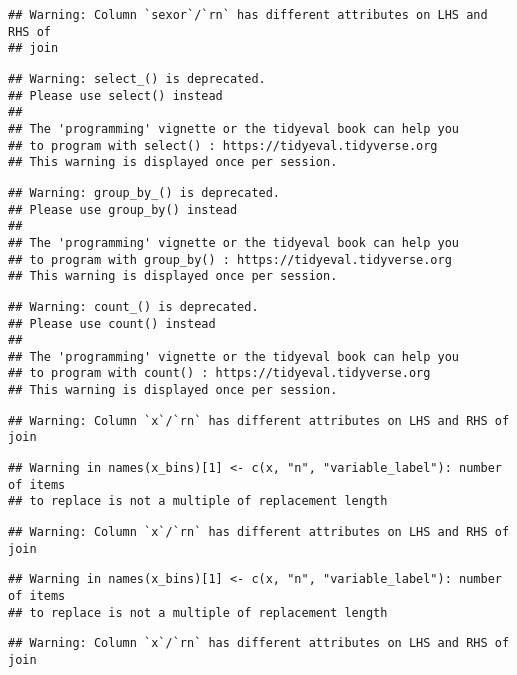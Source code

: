 \documentclass[man]{apa6}
\begin{document}
\begin{verbatim}
## Warning: Column `sexor`/`rn` has different attributes on LHS and RHS of
## join
\end{verbatim}

\begin{verbatim}
## Warning: select_() is deprecated. 
## Please use select() instead
## 
## The 'programming' vignette or the tidyeval book can help you
## to program with select() : https://tidyeval.tidyverse.org
## This warning is displayed once per session.
\end{verbatim}

\begin{verbatim}
## Warning: group_by_() is deprecated. 
## Please use group_by() instead
## 
## The 'programming' vignette or the tidyeval book can help you
## to program with group_by() : https://tidyeval.tidyverse.org
## This warning is displayed once per session.
\end{verbatim}

\begin{verbatim}
## Warning: count_() is deprecated. 
## Please use count() instead
## 
## The 'programming' vignette or the tidyeval book can help you
## to program with count() : https://tidyeval.tidyverse.org
## This warning is displayed once per session.
\end{verbatim}

\begin{verbatim}
## Warning: Column `x`/`rn` has different attributes on LHS and RHS of join
\end{verbatim}

\begin{verbatim}
## Warning in names(x_bins)[1] <- c(x, "n", "variable_label"): number of items
## to replace is not a multiple of replacement length
\end{verbatim}

\begin{verbatim}
## Warning: Column `x`/`rn` has different attributes on LHS and RHS of join
\end{verbatim}

\begin{verbatim}
## Warning in names(x_bins)[1] <- c(x, "n", "variable_label"): number of items
## to replace is not a multiple of replacement length
\end{verbatim}

\begin{verbatim}
## Warning: Column `x`/`rn` has different attributes on LHS and RHS of join
\end{verbatim}
\end{document}
